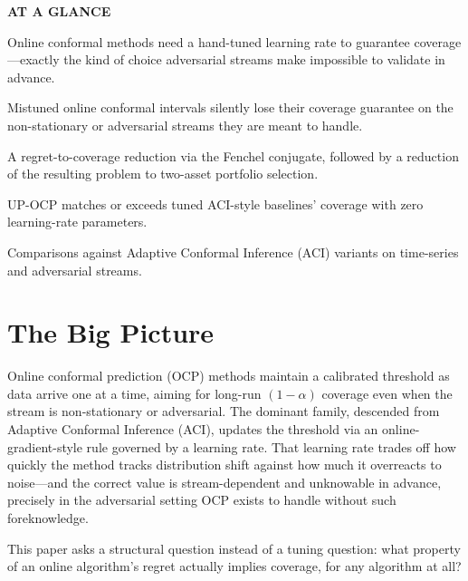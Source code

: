 \documentclass[10pt,twocolumn]{article}
\begin{document}
\begin{mdframed}[backgroundcolor=boxgray,linecolor=rulered,linewidth=1pt,
    innerleftmargin=6pt,innerrightmargin=6pt,
    innertopmargin=6pt,innerbottommargin=6pt]
\textbf{\small AT A GLANCE}\par\vspace{4pt}
\begin{description}[leftmargin=0pt,labelsep=4pt,itemsep=2pt,parsep=0pt,
    font=\small\bfseries]
  \item[Problem:] Online conformal methods need a hand-tuned learning
    rate to guarantee coverage---exactly the kind of choice adversarial
    streams make impossible to validate in advance.
  \item[Why it matters:] Mistuned online conformal intervals silently
    lose their coverage guarantee on the non-stationary or adversarial
    streams they are meant to handle.
  \item[Method:] A regret-to-coverage reduction via the Fenchel
    conjugate, followed by a reduction of the resulting problem to
    two-asset portfolio selection.
  \item[Result:] UP-OCP matches or exceeds tuned ACI-style baselines'
    coverage with zero learning-rate parameters.
  \item[Evidence:] Comparisons against Adaptive Conformal Inference (ACI)
    variants on time-series and adversarial streams.
\end{description}
\end{mdframed}

\section{The Big Picture}

Online conformal prediction (OCP) methods maintain a calibrated
threshold as data arrive one at a time, aiming for long-run
$(1-\alpha)$ coverage even when the stream is non-stationary or
adversarial. The dominant family, descended from Adaptive Conformal
Inference (ACI), updates the threshold via an online-gradient-style
rule governed by a learning rate. That learning rate trades off how
quickly the method tracks distribution shift against how much it
overreacts to noise---and the correct value is stream-dependent and
unknowable in advance, precisely in the adversarial setting OCP exists
to handle without such foreknowledge.

This paper asks a structural question instead of a tuning question:
what property of an online algorithm's regret actually implies
coverage, for any algorithm at all?
\end{document}

